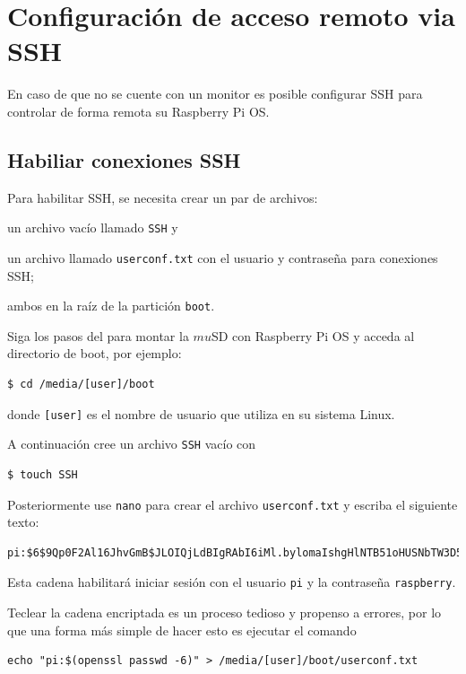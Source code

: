\documentclass[letterpaper,10.5pt]{article}
\begin{document}
\section{Configuración de acceso remoto via SSH}%
\label{sec:annex1}
En caso de que no se cuente con un monitor es posible configurar SSH para controlar de forma remota su Raspberry Pi OS. %

\subsection{Habiliar conexiones SSH}%
\label{sec:annex1-ssh-enable}
Para habilitar SSH, se necesita crear un par de archivos:
\begin{enumerate*}[label=\roman*\rpar]
	\item un archivo vacío llamado \texttt{SSH}
	y
	\item un archivo llamado \texttt{userconf.txt} con el usuario y contraseña para conexiones SSH; %
\end{enumerate*}
ambos en la raíz de la partición \texttt{boot}.

Siga los pasos del  para montar la $mu$SD con Raspberry Pi OS y acceda al directorio de boot, por ejemplo:

\begin{Verbatim}[fontsize=\footnotesize]
$ cd /media/[user]/boot
\end{Verbatim}

\noindent donde \texttt{[user]} es el nombre de usuario que utiliza en su sistema Linux.

A continuación cree un archivo \texttt{SSH} vacío con
\begin{Verbatim}[fontsize=\scriptsize]
$ touch SSH
\end{Verbatim}
\noindent
Posteriormente use \texttt{nano} para crear el archivo \texttt{userconf.txt} y escriba el siguiente texto:
\begin{Verbatim}[fontsize=\scriptsize]
pi:$6$9Qp0F2Al16JhvGmB$JLOIQjLdBIgRAbI6iMl.bylomaIshgHlNTB51oHUSNbTW3D5l6hEnPr6HEBtMo/0IKwlGkc7.FlFOhaMwPKB1/
\end{Verbatim}

Esta cadena habilitará iniciar sesión con el usuario \texttt{pi} y la contraseña \texttt{raspberry}.

Teclear la cadena encriptada es un proceso tedioso y propenso a errores, por lo que una forma más simple de hacer esto es ejecutar el comando

\begin{Verbatim}[fontsize=\footnotesize]
echo "pi:$(openssl passwd -6)" > /media/[user]/boot/userconf.txt
\end{Verbatim}
\end{document}

